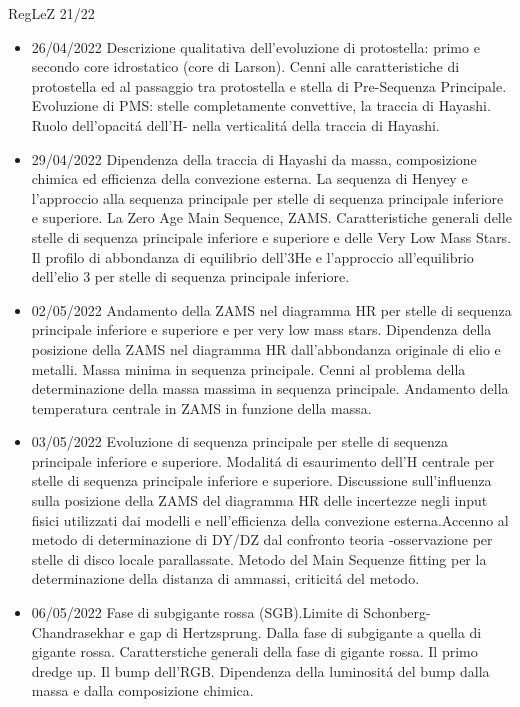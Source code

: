\begin{frame}[allowframebreaks]{RegLeZ 21/22}
\begin{itemize}
\item 26/04/2022 Descrizione qualitativa dell'evoluzione di protostella: primo e secondo core idrostatico (core di Larson). Cenni alle caratteristiche di protostella ed al passaggio tra protostella e stella di Pre-Sequenza Principale. Evoluzione di PMS: stelle completamente convettive, la traccia di Hayashi. Ruolo dell'opacit\'a dell'H- nella verticalit\'a della traccia di Hayashi.
\item 29/04/2022 Dipendenza della traccia di Hayashi da massa, composizione chimica ed efficienza della convezione esterna. La sequenza di Henyey e l'approccio alla sequenza principale per stelle di sequenza principale inferiore e superiore. La Zero Age Main Sequence, ZAMS. Caratteristiche generali delle stelle di sequenza principale inferiore e superiore e delle Very Low Mass Stars. Il profilo di abbondanza di equilibrio dell'3He e l'approccio all'equilibrio dell'elio 3 per stelle di sequenza principale inferiore.
\item 02/05/2022 Andamento della ZAMS nel diagramma HR per stelle di sequenza principale inferiore e superiore e per very low mass stars. Dipendenza della posizione della ZAMS nel diagramma HR dall'abbondanza originale di elio e metalli. Massa minima in sequenza principale. Cenni al problema della determinazione della massa massima in sequenza principale. Andamento della temperatura centrale in ZAMS in funzione della massa.
\item 03/05/2022 Evoluzione di sequenza principale per stelle di sequenza principale inferiore e superiore. Modalit\'a di esaurimento dell'H centrale per stelle di sequenza principale inferiore e superiore. Discussione sull'influenza sulla posizione della ZAMS del diagramma HR delle incertezze negli input fisici utilizzati dai modelli e nell'efficienza della convezione esterna.Accenno al metodo di determinazione di DY/DZ dal confronto teoria -osservazione per stelle di disco locale parallassate. Metodo del Main Sequenze fitting per la determinazione della distanza di ammassi, criticit\'a del metodo.
\item 06/05/2022 Fase di subgigante rossa (SGB).Limite di Schonberg-Chandrasekhar e gap di Hertzsprung. Dalla fase di subgigante a quella di gigante rossa. Caratterstiche generali della fase di gigante rossa. Il primo dredge up. Il bump dell'RGB. Dipendenza della luminosit\'a del bump dalla massa e dalla composizione chimica.

\end{itemize}
\end{frame}
